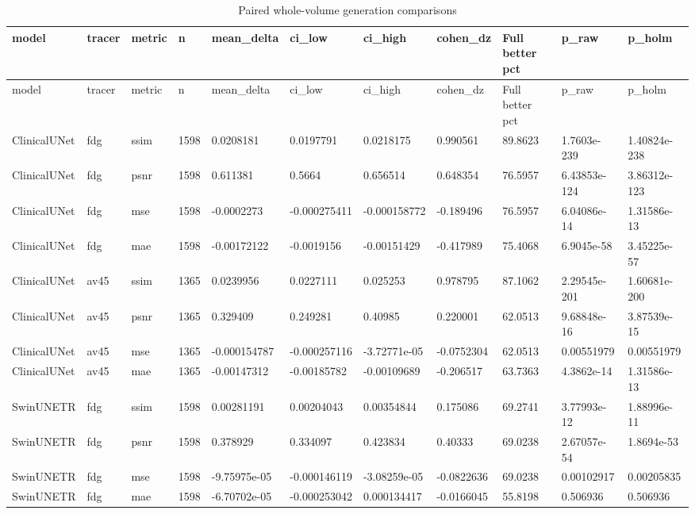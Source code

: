 \documentclass{article}
\begin{document}
\begin{landscape}
\begingroup
\footnotesize
\setlength{\tabcolsep}{4pt}
\begin{longtable}{lllllllllll}
\caption{Paired whole-volume generation comparisons}\label{tab:paired_generation}\\
\toprule
model & tracer & metric & n & mean\_delta & ci\_low & ci\_high & cohen\_dz & Full better pct & p\_raw & p\_holm \\
\midrule
\endfirsthead
\toprule
model & tracer & metric & n & mean\_delta & ci\_low & ci\_high & cohen\_dz & Full better pct & p\_raw & p\_holm \\
\midrule
\endhead
\bottomrule
\endfoot
ClinicalUNet & fdg & ssim & 1598 & 0.0208181 & 0.0197791 & 0.0218175 & 0.990561 & 89.8623 & 1.7603e-239 & 1.40824e-238 \\
ClinicalUNet & fdg & psnr & 1598 & 0.611381 & 0.5664 & 0.656514 & 0.648354 & 76.5957 & 6.43853e-124 & 3.86312e-123 \\
ClinicalUNet & fdg & mse & 1598 & -0.0002273 & -0.000275411 & -0.000158772 & -0.189496 & 76.5957 & 6.04086e-14 & 1.31586e-13 \\
ClinicalUNet & fdg & mae & 1598 & -0.00172122 & -0.0019156 & -0.00151429 & -0.417989 & 75.4068 & 6.9045e-58 & 3.45225e-57 \\
ClinicalUNet & av45 & ssim & 1365 & 0.0239956 & 0.0227111 & 0.025253 & 0.978795 & 87.1062 & 2.29545e-201 & 1.60681e-200 \\
ClinicalUNet & av45 & psnr & 1365 & 0.329409 & 0.249281 & 0.40985 & 0.220001 & 62.0513 & 9.68848e-16 & 3.87539e-15 \\
ClinicalUNet & av45 & mse & 1365 & -0.000154787 & -0.000257116 & -3.72771e-05 & -0.0752304 & 62.0513 & 0.00551979 & 0.00551979 \\
ClinicalUNet & av45 & mae & 1365 & -0.00147312 & -0.00185782 & -0.00109689 & -0.206517 & 63.7363 & 4.3862e-14 & 1.31586e-13 \\
SwinUNETR & fdg & ssim & 1598 & 0.00281191 & 0.00204043 & 0.00354844 & 0.175086 & 69.2741 & 3.77993e-12 & 1.88996e-11 \\
SwinUNETR & fdg & psnr & 1598 & 0.378929 & 0.334097 & 0.423834 & 0.40333 & 69.0238 & 2.67057e-54 & 1.8694e-53 \\
SwinUNETR & fdg & mse & 1598 & -9.75975e-05 & -0.000146119 & -3.08259e-05 & -0.0822636 & 69.0238 & 0.00102917 & 0.00205835 \\
SwinUNETR & fdg & mae & 1598 & -6.70702e-05 & -0.000253042 & 0.000134417 & -0.0166045 & 55.8198 & 0.506936 & 0.506936 \\

\end{longtable}
\end{landscape}
\end{document}
